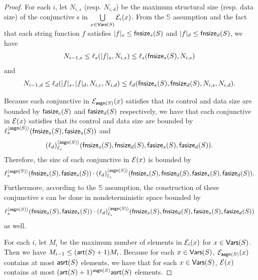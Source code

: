 \begin{proof}

For each $i$, let $N_{i,s}$ (resp. $N_{i, d}$) be the maximum structural size (resp. data size) of the conjunctive \SA{}s in $\bigcup \limits_{x \in \mathsf{Vars}(S)} \mathcal{E}_i(x)$. From the $\mathbb{S}$\prerec{} assumption and the fact that each string function $f$ satisfies  $|f|_s \le \mathsf{fnsize}_s(S)$ and $|f|_d \le \mathsf{fnsize}_d(S)$, we have 
%
$$N_{i-1, s} \le \ell_s(|f|_s, N_{i, s}) \le \ell_s(\mathsf{fnsize}_s(S), N_{i,s})$$ 
%
and
%
$$N_{i-1, d} \le \ell_d(|f|_s, |f|_d, N_{i, c}, N_{i,d}) \le \ell_d(\mathsf{fnsize}_s(S), \mathsf{fnsize}_d(S), N_{i, s}, N_{i,d}).$$ 

Because each conjunctive \SA{} in $\mathcal{E}_{\mathsf{asgn}(S)}(x)$ satisfies that its control and data size are bounded by $\mathsf{fasize}_c(S)$ and $\mathsf{fasize}_d(S)$ respectively, 
we have that each conjunctive \SA{} in $\mathcal{E}(x)$ satisfies that its control and data size are bounded by $\ell_s^{\langle \mathsf{asgn}(S) \rangle}(\mathsf{fnsize}_s(S), \mathsf{fasize}_s(S))$ and 
%
\[ (\ell_d)^{\langle  \mathsf{asgn}(S) \rangle}_{\ell_s}(\mathsf{fnsize}_s(S), \mathsf{fnsize}_d(S), \mathsf{fasize}_s(S), \mathsf{fasize}_d(S)).\]
% 
Therefore, the size of each conjunctive \SA{} in $\mathcal{E}(x)$ is bounded by 
{
\small
$$\ell_s^{\langle  \mathsf{asgn}(S) \rangle}(\mathsf{fnsize}_s(S), \mathsf{fasize}_s(S)) \cdot (\ell_d)^{\langle \mathsf{asgn}(S) \rangle}_{\ell_s}(\mathsf{fnsize}_s(S),  \mathsf{fnsize}_d(S), \mathsf{fasize}_s(S), \mathsf{fasize}_d(S)).$$
}
Furthermore, according to the $\mathbb{S}$\prerec{} assumption, the construction of these conjunctive \SA{}s can be done in nondeterministic space bounded by 
%
{
\small
$$\ell_s^{\langle  \mathsf{asgn}(S) \rangle}(\mathsf{fnsize}_s(S), \mathsf{fasize}_s(S)) \cdot (\ell_d)^{\langle \mathsf{asgn}(S) \rangle}_{\ell_s}(\mathsf{fnsize}_s(S),  \mathsf{fnsize}_d(S), \mathsf{fasize}_s(S), \mathsf{fasize}_d(S)) $$
}
as well.
%


For each $i$, let $M_i$ be the maximum number of elements in $\mathcal{E}_i(x)$ for $x  \in \mathsf{Vars}(S)$.
Then we have $M_{i-1} \le (\mathsf{art}(S)+1)M_i $. Because for each $x \in \mathsf{Vars}(S)$, $\mathcal{E}_{\mathsf{asgn}(S)}(x)$ contains at most $\mathsf{asrt}(S)$ elements, we have that for each $x \in \mathsf{Vars}(S)$, $\mathcal{E}(x)$ contains at most $(\mathsf{art}(S)+1)^{\mathsf{asgn}(S)}\mathsf{asrt}(S)$ elements. 


\end{proof}
